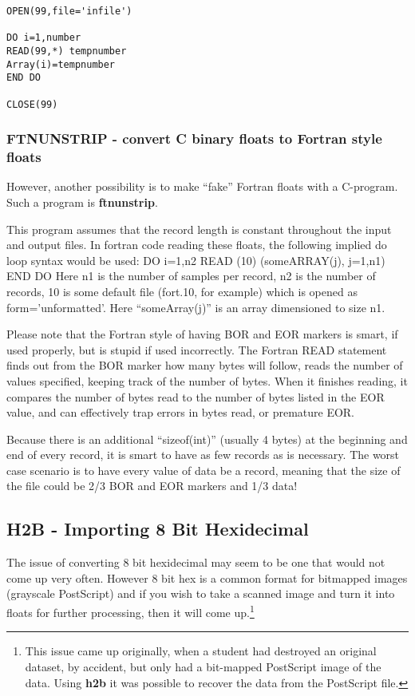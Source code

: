 {{{{\small\begin{verbatim}
OPEN(99,file='infile')

DO i=1,number
READ(99,*) tempnumber
Array(i)=tempnumber
END DO

CLOSE(99)
\end{verbatim}}\noindent

\subsubsection{FTNUNSTRIP - convert C binary floats to Fortran style floats }

However, another possibility is to make ``fake'' Fortran floats
with a C-program. Such a program is {\bf ftnunstrip}.

This program assumes that the record length is constant
throughout the input and output files.
In fortran code reading these floats, the following implied
do loop syntax would be used:
        DO i=1,n2
                 READ (10) (someARRAY(j), j=1,n1)
        END DO
Here n1 is the number of samples per record, n2 is the number
of records, 10 is some default file (fort.10, for example) which
is opened as form='unformatted'. Here  ``someArray(j)'' is an array
dimensioned to size n1.

Please note that the Fortran style of having BOR and EOR markers
is smart, if used properly, but is stupid if used incorrectly. 
The Fortran READ statement finds out from the BOR marker how many 
bytes will follow, reads the number of values specified, keeping 
track of the number of bytes. When it finishes reading, it compares
the number of bytes read to the number of bytes listed in the EOR
value, and can effectively trap errors in bytes read, or premature
EOR.

Because there is an additional ``sizeof(int)'' (usually 4 bytes)
at the beginning and end of every record, it is smart to have as few
records as is necessary. The worst case scenario is to have every
value of data be a record, meaning that the size of the file could
be 2/3 BOR and EOR markers and 1/3 data!

\subsection{H2B - Importing 8 Bit Hexidecimal}

The issue of converting 8 bit hexidecimal may seem to be one
that would not come up very often.
However 8 bit hex is a common format for bitmapped images
(grayscale PostScript) and if you wish to take a scanned image
and turn it into floats for further processing, then it will
come up.\footnote{This issue came up originally, when a student
had destroyed an original dataset, by accident, but only had
a bit-mapped PostScript image of the data. Using {\bf h2b}
it was possible to recover the data from the PostScript file.}

}}}
